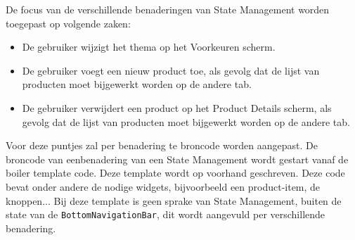De focus van de verschillende benaderingen van State Management worden toegepast op volgende zaken: 
\begin{itemize}
    \item De gebruiker wijzigt het thema op het Voorkeuren scherm.
    \item De gebruiker voegt een nieuw product toe, als gevolg dat de lijst van producten moet bijgewerkt worden op de andere tab.
    \item De gebruiker verwijdert een product op het Product Details scherm, als gevolg dat de lijst van producten moet bijgewerkt worden op de andere tab.
\end{itemize}
Voor deze puntjes zal per benadering te broncode worden aangepast. De broncode van eenbenadering van een State Management wordt gestart vanaf de boiler template code. Deze template wordt op voorhand geschreven. Deze code bevat onder andere de nodige widgets, bijvoorbeeld een product-item, de knoppen...
Bij deze template is geen sprake van State Management, buiten de state van de \verb|BottomNavigationBar|, dit wordt aangevuld per verschillende benadering.

